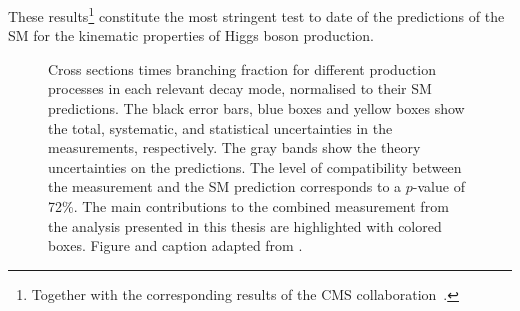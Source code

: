 These results\footnote{Together with the corresponding results of the CMS collaboration~\cite{CMSNaturePaper}.} constitute the most stringent test to date of the predictions of the SM for the kinematic properties of Higgs boson production.
\begin{figure}[h!]
  \caption[Higgs boson cross sections times branching fraction for different production processes in each relevant decay mode.]{Cross sections times branching fraction for different production processes in each relevant decay mode, normalised to their SM predictions. The black error bars, blue boxes and yellow boxes show the total, systematic, and statistical uncertainties in the measurements, respectively. The gray bands show the theory uncertainties on the predictions. The level of compatibility between the measurement and the SM prediction corresponds to a $p$-value of 72\%. 
  The main contributions to the combined measurement from the \HWW analysis presented in this thesis are highlighted with colored boxes. 
  Figure and caption adapted from .}
  \label{fig:prod-per-channel}
\end{figure}

